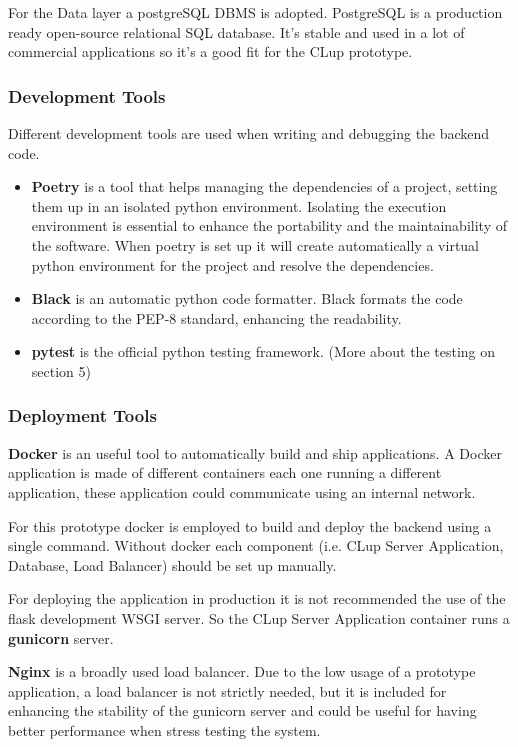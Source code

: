 For the Data layer a postgreSQL DBMS is adopted. PostgreSQL is a production ready open-source relational SQL database. It's stable and used in a lot of commercial applications so it's a good fit for the CLup prototype.

\subsubsection{Development Tools}
Different development tools are used when writing and debugging the backend code.
\begin{itemize}
    \item \textbf{Poetry} is a tool that helps managing the dependencies of a project, setting them up in an isolated python environment. Isolating the execution environment is essential to enhance the portability and the maintainability of the software. When poetry is set up it will create automatically a virtual python environment for the project and resolve the dependencies.
    \item \textbf{Black} is an automatic python code formatter. Black formats the code according to the PEP-8 standard, enhancing the readability.
    \item \textbf{pytest} is the official python testing framework. (More about the testing on section 5)
\end{itemize} 

\subsubsection{Deployment Tools}
\textbf{Docker} is an useful tool to automatically build and ship applications. A Docker application is made of different containers each one running a different application, these application could communicate using an internal network.

For this prototype docker is employed to build and deploy the backend using a single command. 
Without docker each component (i.e. CLup Server Application, Database, Load Balancer) should be set up manually.

\medskip

For deploying the application in production it is not recommended the use of the flask development WSGI server. So the CLup Server Application container runs a \textbf{gunicorn} server.

\medskip

\textbf{Nginx} is a broadly used load balancer. Due to the low usage of a prototype application, a load balancer is not strictly needed, but it is included for enhancing the stability of the gunicorn server and could be useful for having better performance when stress testing the system.


